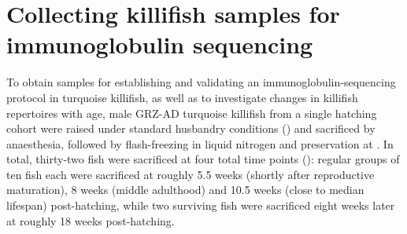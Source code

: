 



\section{Collecting killifish samples for immunoglobulin sequencing}
\label{sec:igseq_samples}

To obtain samples for establishing and validating an immunoglobulin-sequencing protocol in turquoise killifish, as well as to investigate changes in killifish repertoires with age, male GRZ-AD turquoise killifish from a single hatching cohort were raised under standard husbandry conditions () and sacrificed by anaesthesia, followed by flash-freezing in liquid nitrogen and preservation at . In total, thirty-two fish were sacrificed at four total time points (): regular groups of ten fish each were sacrificed at roughly 5.5 weeks (shortly after reproductive maturation), 8 weeks (middle adulthood) and 10.5 weeks (close to median lifespan) post-hatching, while two surviving fish were sacrificed eight weeks later at roughly 18 weeks post-hatching.

